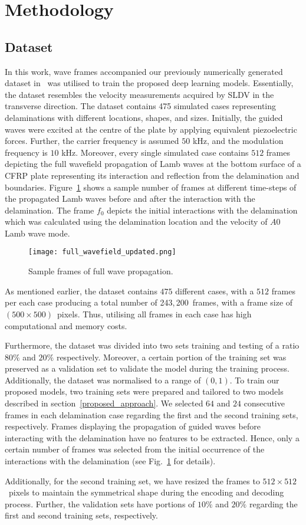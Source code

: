 \section{Methodology}
\subsection{Dataset}
In this work, wave frames accompanied our previously numerically generated dataset in~\cite{Ijjeh2021} was utilised to train the proposed deep learning models.  
Essentially, the dataset resembles the velocity measurements acquired by SLDV in the transverse direction.
The dataset contains 475 simulated cases representing delaminations with different locations, shapes, and sizes. 
Initially, the guided waves were excited at the centre of the plate by applying equivalent piezoelectric forces.
Further, the carrier frequency is assumed \(50\) kHz, and the modulation frequency is \(10\) kHz.
Moreover, every single simulated case contains \(512\) frames depicting the full wavefield propagation of Lamb waves at the bottom surface of a CFRP plate representing its interaction and reflection from the delamination and boundaries.
Figure~\ref{fig:Full_wave} shows a sample number of frames at different time-steps of the propagated Lamb waves before and after the interaction with the delamination.
The frame \(f_{0}\) depicts the initial interactions with the delamination which was calculated using the delamination location and the velocity of \(A0\) Lamb wave mode.
\begin{figure}[!h]
	\centering
	\texttt{[image: full\_wavefield\_updated.png]}
	\caption{Sample frames of full wave propagation.}
	\label{fig:Full_wave}
\end{figure}

As mentioned earlier, the dataset contains \(475\) different cases, with a \(512\) frames per each case producing a total number of 243,\,200~frames, with a frame size of \((500\times500)\)~pixels.
Thus, utilising all frames in each case has high computational and memory costs.

Furthermore, the dataset was divided into two sets training and testing of a ratio \(80\%\) and \(20\% \) respectively.
Moreover, a certain portion of the training set was preserved as a validation set to validate the model during the training process.
Additionally, the dataset was normalised to a range of \((0, 1)\).
To train our proposed models, two training sets were prepared and tailored to two models described in section~\ref{proposed_approach}.
We selected \(64\) and \(24\) consecutive frames in each delamination case regarding the first and the second training sets, respectively.
Frames displaying the propagation of guided waves before interacting with the delamination have no features to be extracted.  
Hence, only a certain number of frames was selected from the initial occurrence of the interactions with the delamination (see Fig.~\ref{fig:Full_wave} for details).

Additionally, for the second training set, we have resized the frames to \(512\times512\)~pixels to maintain the symmetrical shape during the encoding and decoding process.
Further, the validation sets have portions of \(10\%\) and \(20\%\) regarding the first and second training sets, respectively.